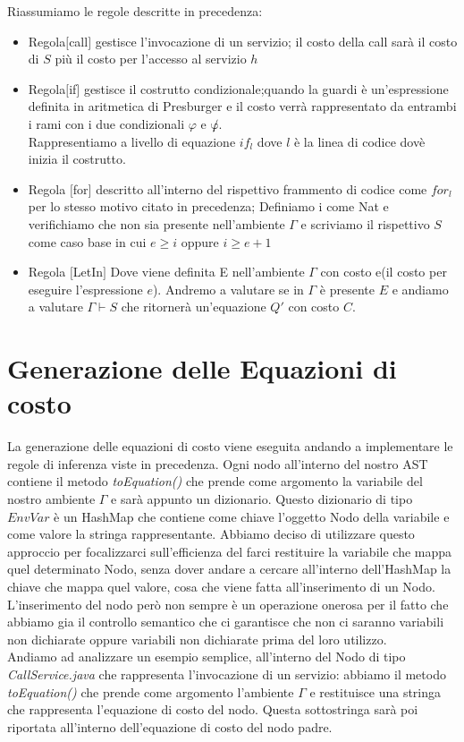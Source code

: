 \documentclass[../../main.tex]{subfiles}
\begin{document}
Riassumiamo le regole descritte in precedenza:\\
\begin{itemize}
    \item Regola$[$call$]$ gestisce l'invocazione di un servizio; il costo della call sarà il costo di $S$ più il costo per l'accesso al servizio $h$ 
    \item Regola$[$if$]$ gestisce il costrutto condizionale;quando la guardi è un'espressione definita in aritmetica di Presburger e il costo verrà rappresentato da entrambi i rami con i due condizionali $\varphi $ e $\not \varphi$.\\Rappresentiamo a livello di equazione $if_l$ dove $l$ è la linea di codice dovè inizia il costrutto.
    \item Regola $[$for$]$ descritto all'interno del rispettivo frammento di codice come $for_l$ per lo stesso motivo citato in precedenza; Definiamo i come Nat e verifichiamo che non sia presente nell'ambiente $\varGamma$ e scriviamo il rispettivo $S$ come caso base in cui $e \geq i$ oppure $i \geq e + 1$
    \item Regola $[$LetIn$]$ Dove viene definita E nell'ambiente $\varGamma$ con costo e(il costo per eseguire l'espressione $e$). Andremo a valutare se in $\varGamma$ è presente $E$ e andiamo a valutare $\varGamma \vdash S$ che ritornerà un'equazione $Q'$ con costo $C$.
\end{itemize}
\section{Generazione delle Equazioni di costo}

La generazione delle equazioni di costo viene eseguita andando a implementare le regole di inferenza viste in precedenza.
Ogni nodo all'interno del nostro AST contiene il metodo \textit{toEquation()} che prende come argomento la variabile del nostro ambiente $\varGamma$ e sarà appunto un dizionario.
Questo dizionario di tipo $EnvVar$ è un HashMap che contiene come chiave l'oggetto Nodo della variabile e come valore la stringa rappresentante.
Abbiamo deciso di utilizzare questo approccio per focalizzarci sull'efficienza del farci restituire la variabile che mappa quel determinato Nodo, senza dover andare a cercare all'interno dell'HashMap la chiave che mappa quel valore, cosa che viene fatta all'inserimento di un Nodo.
L'inserimento del nodo però non sempre è un operazione onerosa per il fatto che abbiamo gia il controllo semantico che ci garantisce che non ci saranno variabili non dichiarate oppure variabili non dichiarate prima del loro utilizzo.\\
Andiamo ad analizzare un esempio semplice, all'interno del Nodo di tipo \textit{CallService.java} che rappresenta l'invocazione di un servizio: abbiamo il metodo \textit{toEquation()} che prende come argomento l'ambiente $\varGamma$ e restituisce una stringa che rappresenta l'equazione di costo del nodo. Questa sottostringa sarà poi riportata all'interno dell'equazione di costo del nodo padre.
\end{document}
